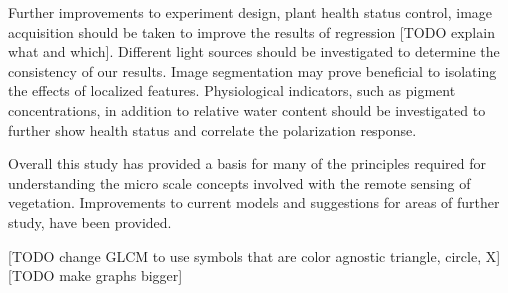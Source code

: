 Further improvements to experiment design, plant health status control, image acquisition should be taken to improve the results of regression [TODO explain what and which]. Different light sources should be investigated to determine the consistency of our results.  Image segmentation may prove beneficial to isolating the effects of localized features.  Physiological indicators, such as pigment concentrations, in addition to relative water content should be investigated to further show health status and correlate the polarization response.

Overall this study has provided a basis for many of the principles required for understanding the micro scale concepts involved with the remote sensing of vegetation. Improvements to current models and suggestions for areas of further study, have been provided.

[TODO change GLCM to use symbols that are color agnostic triangle, circle, X]
[TODO make graphs bigger]
